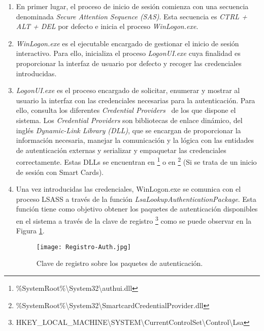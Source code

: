\begin{enumerate}
\item En primer lugar, el proceso de inicio de sesión comienza con una secuencia denominada {\it Secure Attention Sequence (SAS)}. Esta secuencia es {\it CTRL + ALT + DEL} por defecto e inicia el proceso {\it WinLogon.exe}.

\item {\it WinLogon.exe} es el ejecutable encargado de gestionar el inicio de sesión interactivo. Para ello, inicializa el proceso {\it LogonUI.exe} cuya finalidad es proporcionar la interfaz de usuario por defecto y recoger las credenciales introducidas. 

\item {\it LogonUI.exe} es el proceso encargado de solicitar, enumerar y mostrar al usuario la interfaz con las credenciales necesarias para la autenticación. Para ello, consulta los diferentes {\it Credential Providers}~\cite{Capitulo2:CredentialProviders} de los que dispone el sistema. Los {\it Credential Providers} son bibliotecas de enlace dinámico, del inglés {\it Dynamic-Link Library (DLL)}, que se encargan de proporcionar la información necesaria, manejar la co\-mu\-ni\-ca\-ción y la lógica con las entidades de autenticación externas y serializar y empaquetar las credenciales correctamente. Estas DLLs se encuentran en \footnote{\%SystemRoot\%\textbackslash{}System32\textbackslash{}authui.dll} o en \footnote{\%SystemRoot\%\textbackslash{}System32\textbackslash{}SmartcardCredentialProvider.dll} (Si se trata de un inicio de sesión con Smart Cards).

\item Una vez introducidas las credenciales, {WinLogon.exe} se comunica con el proceso LSASS a través de la función {\it LsaLookupAuthenticationPackage}. Esta función tiene como objetivo obtener los paquetes de autenticación disponibles en el sistema a través de la clave de registro \footnote{HKEY\_LOCAL\_MACHINE\textbackslash{}SYSTEM\textbackslash{}CurrentControlSet\textbackslash{}Control\textbackslash{}Lsa} como se puede observar en la Figura \ref{Registro-Auth}.

\begin{figure}[t!] %
\begin{center}
\texttt{[image: Registro-Auth.jpg]}
\end{center}
\caption{Clave de registro sobre los paquetes de autenticación.}
\label{Registro-Auth}
\end{figure}


\end{enumerate}

